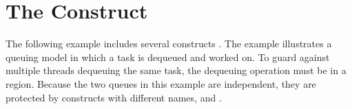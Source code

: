 \pagebreak
\chapter{The  Construct}
\label{chap:critical}

The following example includes several  constructs . The example 
illustrates a queuing model in which a task is dequeued and worked on. To guard 
against multiple threads dequeuing the same task, the dequeuing operation must 
be in a  region. Because the two queues in this example are independent, 
they are protected by  constructs with different names,  
and .




